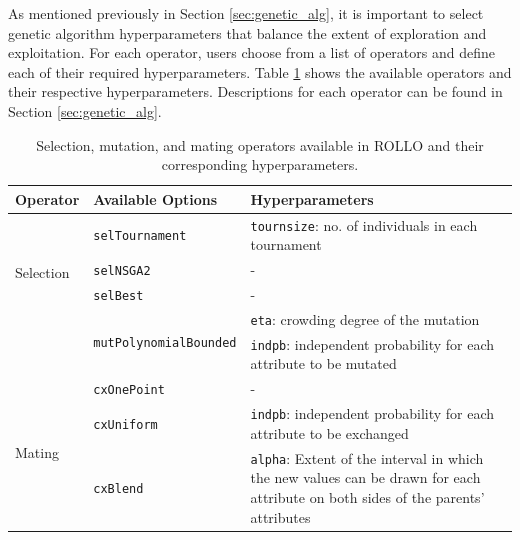 As mentioned previously in Section \ref{sec:genetic_alg}, it is important to 
select genetic algorithm hyperparameters that balance the extent of exploration 
and exploitation.
For each operator, users choose from a list of operators and define each
of their required hyperparameters. 
Table \ref{tab:deap_operators} shows the available operators and their respective 
hyperparameters. 
Descriptions for each operator can be found in Section \ref{sec:genetic_alg}.
\begin{table}[]
    \centering
    \onehalfspacing
    \caption{Selection, mutation, and mating operators available in 
    \acrfull{ROLLO} and their corresponding hyperparameters. }
	\label{tab:deap_operators}
    \footnotesize
    \begin{tabular}{l|p{}|p{}}
    \hline
    \textbf{Operator} & \textbf{Available Options} & \textbf{Hyperparameters} \\ \hline
    \multirow{4}{1cm}{Selection} & \texttt{selTournament} & \texttt{tournsize}: no. of individuals in each tournament\\ \cline{2-3}
    & \texttt{selNSGA2} & - \\ \cline{2-3}
    & \texttt{selBest} & - \\ \hline
    \multirow{2}{1cm}{Mutation} & \multirow{2}{2cm}{\texttt{mutPolynomialBounded}} & \texttt{eta}: crowding degree of the mutation\\  
    && \texttt{indpb}: independent probability for each attribute to be mutated\\ \hline
    \multirow{3}{1cm}{Mating} & \texttt{cxOnePoint} & -\\ \cline{2-3}
    & \texttt{cxUniform} & \texttt{indpb}: independent probability for each attribute to be exchanged\\ \cline{2-3}
    & \texttt{cxBlend} & \texttt{alpha}: Extent of the interval in which the new values can be drawn for each attribute on both sides of the parents’ attributes\\ \hline
    \end{tabular}
    \end{table}

